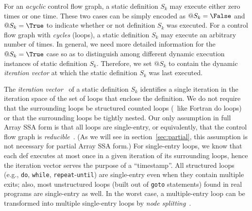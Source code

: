 For an {\it acyclic} control flow graph, a static definition
$S_k$ may execute either zero times or one time.
These two cases can be simply encoded as
$@S_k = \False$ and $@S_k = \True$ to indicate whether
or not definition $S_k$ was executed.
For a control flow graph with {\it cycles} (loops), a static
definition $S_k$
may execute an arbitrary number of times.  In general,
we need more detailed
information for the $@S_k = \True$ case
so as to distinguish among different
dynamic execution instances of static definition $S_k$.
Therefore, we set $@S_k$ to contain the dynamic {\it iteration vector} at
which the static definition $S_k$ was last executed.

The {\it iteration vector}~\cite{Wolf89,Sark91} of a 
static 
definition $S_k$ identifies a single iteration in the iteration space of the
set of loops
that enclose the definition.  
We do
not require that the surrounding loops be structured
counted loops (\ie\ like  Fortran {\sc do} loops) or that the
surrounding loops be tightly nested.  
Our only assumption in full Array SSA form
is that
all loops are single-entry, or equivalently, that the control flow
graph is {\it reducible}~\cite{Hech77,AhSU86}.
(As we will see in section~\ref{sec:partial}, this assumption is not necessary
for partial Array SSA form.)
For single-entry loops, we know that each def executes at most
once in a given iteration of its surrounding loops, hence the iteration vector
serves the purpose of a ``timestamp''.
All structured loops (e.g., {\tt do}, {\tt while},
{\tt repeat}-{\tt until}) are single-entry even when they
contain multiple exits; also, most
unstructured loops (built out of {\tt goto} statements)
found in real programs are single-entry as well.
In the worst case, 
a multiple-entry  loop can be transformed into multiple
single-entry loops by {\it node splitting}~\cite{Hech77,AhSU86}.

